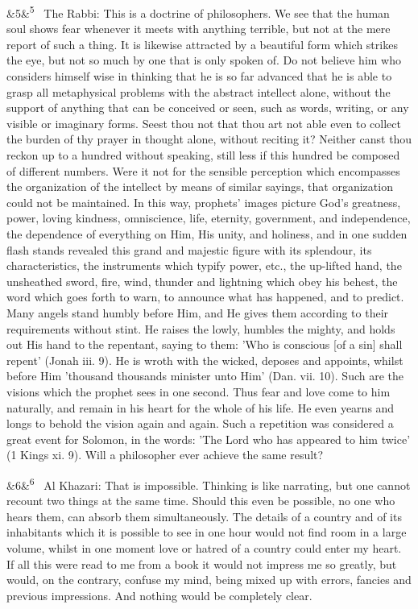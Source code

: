 \documentclass[12pt]{article}
\newcommand{\para}[1][]{\par\noindent\ifx&#1&\else\textsuperscript{\footnotesize #1}~\fi}
\begin{document}
\para[5] The Rabbi: This is a doctrine of philosophers. We see that the human soul shows fear whenever it meets with anything terrible, but not at the mere report of such a thing. It is likewise attracted by a beautiful form which strikes the eye, but not so much by one that is only spoken of. Do not believe him who considers himself wise in thinking that he is so far advanced that he is able to grasp all metaphysical problems with the abstract intellect alone, without the support of anything that can be conceived or seen, such as words, writing, or any visible or imaginary forms. Seest thou not that thou art not able even to collect the burden of thy prayer in thought alone, without reciting it? Neither canst thou reckon up to a hundred without speaking, still less if this hundred be composed of different numbers. Were it not for the sensible perception which encompasses the organization of the intellect by means of similar sayings, that organization could not be maintained. In this way, prophets’ images picture God's greatness, power, loving kindness, omniscience, life, eternity, government, and independence, the dependence of everything on Him, His unity, and holiness, and in one sudden flash stands revealed this grand and majestic figure with its splendour, its characteristics, the instruments which typify power, etc., the up-lifted hand, the unsheathed sword, fire, wind, thunder and lightning which obey his behest, the word which goes forth to warn, to announce what has happened, and to predict. Many angels stand humbly before Him, and He gives them according to their requirements without stint. He raises the lowly, humbles the mighty, and holds out His hand to the repentant, saying to them: 'Who is conscious [of a sin] shall repent' (Jonah iii. 9). He is wroth with the wicked, deposes and appoints, whilst before Him 'thousand thousands minister unto Him' (Dan. vii. 10). Such are the visions which the prophet sees in one second. Thus fear and love come to him naturally, and remain in his heart for the whole of his life. He even yearns and longs to behold the vision again and again. Such a repetition was considered a great event for Solomon, in the words: 'The Lord who has appeared to him twice' (1 Kings xi. 9). Will a philosopher ever achieve the same result?

\para[6] Al Khazari: That is impossible. Thinking is like narrating, but one cannot recount two things at the same time. Should this even be possible, no one who hears them, can absorb them simultaneously. The details of a country and of its inhabitants which it is possible to see in one hour would not find room in a large volume, whilst in one moment love or hatred of a country could enter my heart. If all this were read to me from a book it would not impress me so greatly, but would, on the contrary, confuse my mind, being mixed up with errors, fancies and previous impressions. And nothing would be completely clear.
\end{document}
